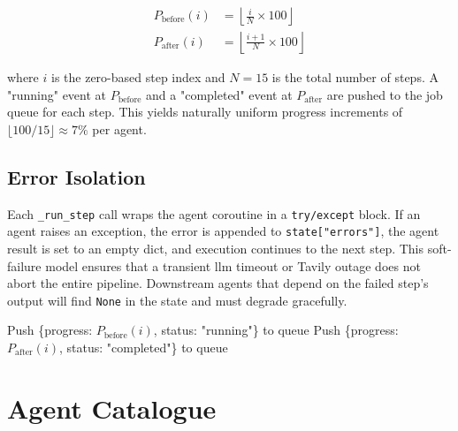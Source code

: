 \documentclass[12pt,a4paper,oneside]{book}
\begin{document}
\begin{align}
  P_{\text{before}}(i) &= \left\lfloor \frac{i}{N} \times 100 \right\rfloor \\
  P_{\text{after}}(i)  &= \left\lfloor \frac{i+1}{N} \times 100 \right\rfloor
\end{align}

where $i$ is the zero-based step index and $N = 15$ is the total number of steps. A "running" event at $P_{\text{before}}$ and a "completed" event at $P_{\text{after}}$ are pushed to the job queue for each step. This yields naturally uniform progress increments of $\lfloor 100/15 \rfloor \approx 7\%$ per agent.

\section{Error Isolation}

Each \texttt{\_run\_step} call wraps the agent coroutine in a \texttt{try/except} block. If an agent raises an exception, the error is appended to \texttt{state["errors"]}, the agent result is set to an empty dict, and execution continues to the next step. This soft-failure model ensures that a transient \gls{llm} timeout or Tavily outage does not abort the entire pipeline. Downstream agents that depend on the failed step's output will find \texttt{None} in the state and must degrade gracefully.

\begin{algorithm}[H]
\SetAlgoLined
{}
Push \{progress: $P_{\text{before}}(i)$, status: "running"\} to queue\;
Push \{progress: $P_{\text{after}}(i)$, status: "completed"\} to queue\;
\;
\caption{\_run\_step: single-agent execution with error isolation}
\label{alg:run_step}
\end{algorithm}

\chapter{Agent Catalogue}
\label{chap:agents}
\end{document}

